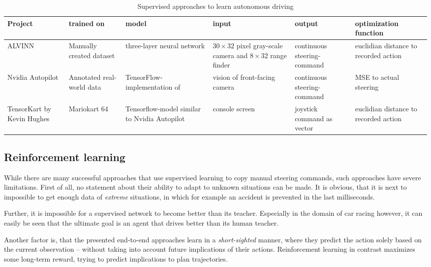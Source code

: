 \begin{table}[h]
	\renewcommand{\arraystretch}{1.2}
	\begin{flushleft}
		\scriptsize
		\begin{tabular}{P{1.6cm}P{1.9cm}P{2.2cm}P{2.5cm}P{2.5cm}P{2.3cm}}
			Project & trained on & model & input & output & optimization function \\
			\hline
			ALVINN\cite{pomerleau_alvinn:_1989} & Manually created dataset & three-layer neural network & $30\times32$ pixel gray-scale camera and $8\times32$ range finder & continuous steering-command & euclidian distance to recorded action\\
			Nvidia Autopilot & Annotated real-world data & TensorFlow-implementation of \cite{bojarski_end_2016} & vision of front-facing camera & continuous steering-command & MSE to actual steering\\
			TensorKart by Kevin Hughes & Mariokart 64 & Tensorflow-model similar to Nvidia Autopilot & console screen & joystick command as vector & euclidian distance to recorded action\\
		\end{tabular}
	\end{flushleft}
	\caption{Supervised approaches to learn autonomous driving}
	\label{tb:svapproaches}
\end{table}

\subsection{Reinforcement learning}

While there are many successful approaches that use supervised learning to copy manual steering commands, such approaches have severe limitations. First of all, no statement about their ability to adapt to unknown situations can be made. It is obvious, that it is next to impossible to get enough data of \textit{extreme} situations, in which for example an accident is prevented in the last milliseconds.

Further, it is impossible for a supervised network to become better than its teacher. Especially in the domain of car racing however, it can easily be seen that the ultimate goal is an agent that drives better than its human teacher.

Another factor is, that the presented end-to-end approaches learn in a \textit{short-sighted} manner, where they predict the action solely based on the current observation -- without taking into account future implications of their actions. Reinforcement learning in contrast maximizes some long-term reward, trying to predict implications to plan trajectories.


